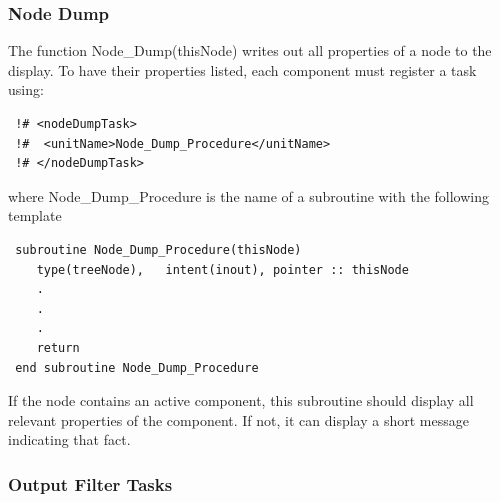 \subsubsection{Node Dump}

The function {\normalfont \ttfamily Node\_Dump(thisNode)} writes out all properties of a node to the display. To have their properties listed, each component must register a task using:
\begin{verbatim}
 !# <nodeDumpTask>
 !#  <unitName>Node_Dump_Procedure</unitName>
 !# </nodeDumpTask>
\end{verbatim}
where {\normalfont \ttfamily Node\_Dump\_Procedure} is the name of a subroutine with the following template
\begin{verbatim}
 subroutine Node_Dump_Procedure(thisNode)
    type(treeNode),   intent(inout), pointer :: thisNode
    .
    .
    .
    return
 end subroutine Node_Dump_Procedure
\end{verbatim}
If the node contains an active component, this subroutine should display all relevant properties of the component. If not, it can display a short message indicating that fact.

\subsubsection{Output Filter Tasks}\label{sec:OutputFilters}

